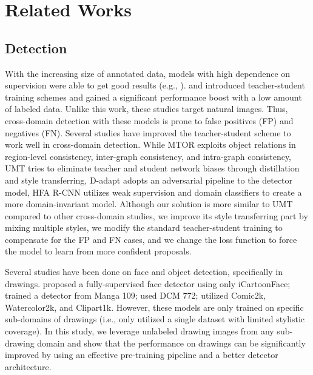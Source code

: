 \documentclass{article}
\begin{document}
\section{Related Works}
\label{section:rel_works}

\subsection{Detection}

With the increasing size of annotated data, models with high dependence on supervision were able to get good results (e.g., \cite{bochkovskiy2020yolov4,DynamicRCNN,yolox2021}). \cite{liu2021unbiased} and \cite{xu2021end} introduced teacher-student training schemes and gained a significant performance boost with a low amount of labeled data. Unlike this work, these studies target natural images. Thus, cross-domain detection with these models is prone to false positives (FP) and negatives (FN). Several studies have improved the teacher-student scheme to work well in cross-domain detection. While MTOR \cite{mtor_model} exploits object relations in region-level consistency, inter-graph consistency, and intra-graph consistency, UMT \cite{umt_model} tries to eliminate teacher and student network biases through distillation and style transferring, D-adapt \cite{dadapt} adopts an adversarial pipeline to the detector model, HFA R-CNN \cite{h2farcnn} utilizes weak supervision and domain classifiers to create a more domain-invariant model. Although our solution is more similar to UMT compared to other cross-domain studies, we improve its style transferring part by mixing multiple styles, we modify the standard teacher-student training to compensate for the FP and FN cases, and we change the loss function to force the model to learn from more confident proposals. 

Several studies have been done on face and object detection, specifically in drawings.  \cite{zhang2020acfd} proposed a fully-supervised face detector using only iCartoonFace; \cite{ogawa2018object} trained a detector from Manga 109; \cite{jimaging4070089} used DCM 772; \cite{inoue2018crossdomain} utilized Comic2k, Watercolor2k, and Clipart1k. However, these models are only trained on specific sub-domains of drawings (i.e., only utilized a single dataset with limited stylistic coverage). In this study, we leverage unlabeled drawing images from any sub-drawing domain and show that the performance on drawings can be significantly improved by using an effective pre-training pipeline and a better detector architecture.
\end{document}

